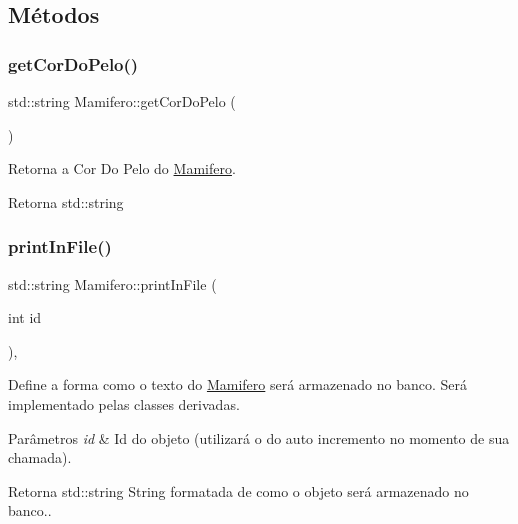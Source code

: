 \subsection{Métodos}
\mbox{\label{classMamifero_a7bf7c25d72549218df4472922ed365de}} 
\subsubsection{\texorpdfstring{get\+Cor\+Do\+Pelo()}{getCorDoPelo()}}
{\footnotesize\ttfamily std\+::string Mamifero\+::get\+Cor\+Do\+Pelo (\begin{DoxyParamCaption}{ }\end{DoxyParamCaption})}



Retorna a Cor Do Pelo do \hyperlink{classMamifero}{Mamifero}. 

\begin{DoxyReturn}{Retorna}
std\+::string 
\end{DoxyReturn}
\mbox{\label{classMamifero_a88e6c2efe9180611486f82d4dbf308ba}} 
\subsubsection{\texorpdfstring{print\+In\+File()}{printInFile()}}
{\footnotesize\ttfamily std\+::string Mamifero\+::print\+In\+File (\begin{DoxyParamCaption}\item[{int}]{id }\end{DoxyParamCaption})\hspace{0.3cm}{\ttfamily [protected]}, {\ttfamily [virtual]}}



Define a forma como o texto do \hyperlink{classMamifero}{Mamifero} será armazenado no banco. Será implementado pelas classes derivadas. 


\begin{DoxyParams}{Parâmetros}
{\em id} & Id do objeto (utilizará o do auto incremento no momento de sua chamada). \\
\hline
\end{DoxyParams}
\begin{DoxyReturn}{Retorna}
std\+::string String formatada de como o objeto será armazenado no banco.. 
\end{DoxyReturn}


